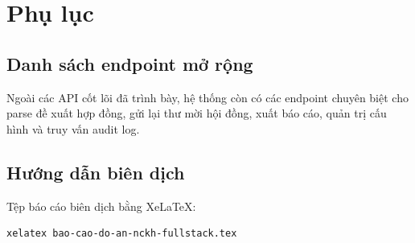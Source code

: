 \documentclass[12pt,a4paper]{report}
\begin{document}
\appendix
\chapter{Phụ lục}
\section{Danh sách endpoint mở rộng}
Ngoài các API cốt lõi đã trình bày, hệ thống còn có các endpoint chuyên biệt cho parse đề xuất hợp đồng, gửi lại thư mời hội đồng, xuất báo cáo, quản trị cấu hình và truy vấn audit log.

\section{Hướng dẫn biên dịch}
Tệp báo cáo biên dịch bằng XeLaTeX:
\begin{verbatim}
xelatex bao-cao-do-an-nckh-fullstack.tex
\end{verbatim}
\end{document}
